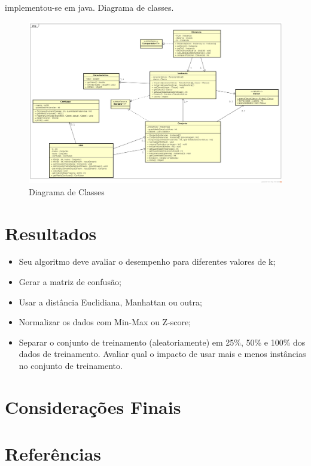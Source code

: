 \documentclass[12pt]{article}
\begin{document}
		implementou-se em java.
		Diagrama de classes.

		\begin{landscape}
		\centering
		\begin{figure}[p]
		\includegraphics[width=1.4\textwidth]{classDiagram.png}
		\caption{Diagrama de Classes}
		\label{fig:classDiagram}
		\end{figure}
		\end{landscape}
		\restoregeometry

	\section{Resultados}\label{sec:resultados}

		\begin{itemize}
			\item Seu algoritmo deve avaliar o desempenho para diferentes valores de k;
			\item Gerar a matriz de confusão;
			\item Usar a distância Euclidiana, Manhattan ou outra;
			\item Normalizar os dados com Min-Max ou Z-score;
			\item Separar o conjunto de treinamento (aleatoriamente) em 25\%, 50\% e 100\% dos dados de treinamento. Avaliar qual o impacto de usar mais e menos instâncias no conjunto de treinamento.
		\end{itemize}


	\section{Considerações Finais}\label{sec:consideracoesFinais}

		

	\section{Referências}\label{sec:referencias}

		
\end{document}

